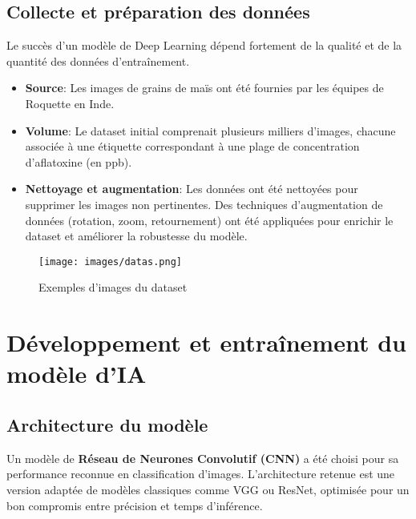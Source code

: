 \documentclass[12pt,a4paper]{report}
\begin{document}
\subsection{Collecte et préparation des données}
Le succès d’un modèle de Deep Learning dépend fortement de la qualité et de la quantité des données d’entraînement.
\begin{itemize}
    \item \textbf{Source}: Les images de grains de maïs ont été fournies par les équipes de Roquette en Inde.
    \item \textbf{Volume}: Le dataset initial comprenait plusieurs milliers d’images, chacune associée à une étiquette correspondant à une plage de concentration d’aflatoxine (en ppb).
    \item \textbf{Nettoyage et augmentation}: Les données ont été nettoyées pour supprimer les images non pertinentes. Des techniques d’augmentation de données (rotation, zoom, retournement) ont été appliquées pour enrichir le dataset et améliorer la robustesse du modèle.
\end{itemize}

\begin{figure}[H]
    \centering
    \texttt{[image: images/datas.png]}
    \caption{Exemples d’images du dataset}
\end{figure}

\section{Développement et entraînement du modèle d’IA}

\subsection{Architecture du modèle}
Un modèle de \textbf{Réseau de Neurones Convolutif (CNN)} a été choisi pour sa performance reconnue en classification d’images. L’architecture retenue est une version adaptée de modèles classiques comme VGG ou ResNet, optimisée pour un bon compromis entre précision et temps d’inférence.
\end{document}
